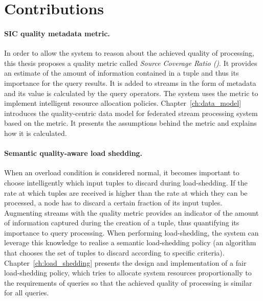 \section{Contributions}
\vspace{-3pt}
\paragraph{SIC quality metadata metric.}
In order to allow the system to reason about the achieved quality of processing, this thesis
proposes a quality metric called \emph{Source Coverage Ratio (\sic)}. 
It provides an estimate of the amount of information contained in a tuple and
thus its importance for the query results. 
It is added to streams in the form of metadata and its value is calculated by the query operators.
The system uses the \sic metric to implement intelligent resource allocation policies.
Chapter~\ref{ch:data_model} introduces the quality-centric data model for federated stream processing
system based on the \sic metric. It presents the assumptions behind the \sic metric and explains
how it is calculated.
\vspace{-3pt}
\paragraph{Semantic quality-aware load shedding.}
When an overload condition is considered normal, it becomes important to choose intelligently which input
tuples to discard during \mbox{load-shedding}. 
If the rate at which tuples are received is higher than the rate at which they can be
processed, a node has to discard a certain fraction of its input
tuples. 
Augmenting streams with the \sic quality metric provides an indicator of the amount of
information captured during the creation of a tuple, thus quantifying its importance to query processing.
When performing \mbox{load-shedding}, the system can leverage this knowledge to realise a semantic
load-shedding policy (\ie an algorithm that chooses the set of tuples to discard according to
specific criteria). 
Chapter~\ref{ch:load_shedding} presents the design and implementation of a fair load-shedding policy,
which tries to allocate system resources proportionally to the requirements of queries so that the
achieved quality of processing is similar for all queries.
\vspace{-3pt}
